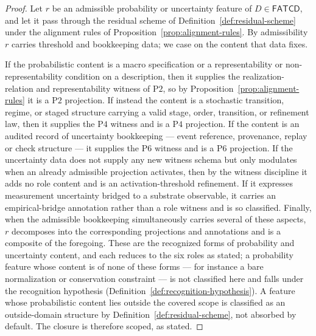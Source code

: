 \documentclass[11pt]{article}
\theoremstyle{definition}
\newcommand{\FATCD}{\ensuremath{\mathsf{FATCD}}}
\newcommand{\Ptwo}{\ensuremath{\mathrm{P2}}}
\newcommand{\Pfour}{\ensuremath{\mathrm{P4}}}
\newcommand{\Psix}{\ensuremath{\mathrm{P6}}}
\begin{document}
\begin{proof}
Let \(r\) be an admissible probability or uncertainty feature of
\(D \in \FATCD{}\), and let it pass through the residual scheme of
Definition~\ref{def:residual-scheme} under the alignment rules of
Proposition~\ref{prop:alignment-rules}. By admissibility \(r\) carries
threshold and bookkeeping data; we case on the content that data fixes.

If the probabilistic content is a macro specification or a
representability or non-representability condition on a description,
then it supplies the realization-relation and representability witness
of \Ptwo{}, so by Proposition~\ref{prop:alignment-rules} it is a
\Ptwo{} projection. If instead the content is a stochastic transition,
regime, or staged structure carrying a valid stage, order, transition,
or refinement law, then it supplies the \Pfour{} witness and is a
\Pfour{} projection. If the content is an audited record of uncertainty
bookkeeping --- event reference, provenance, replay or check structure
--- it supplies the \Psix{} witness and is a \Psix{} projection. If the
uncertainty data does not supply any new witness schema but only
modulates when an already admissible projection activates, then by the
witness discipline it adds no role content and is an
activation-threshold refinement. If it expresses measurement
uncertainty bridged to a substrate observable, it carries an
empirical-bridge annotation rather than a role witness and is so
classified. Finally, when the admissible bookkeeping simultaneously
carries several of these aspects, \(r\) decomposes into the
corresponding projections and annotations and is a composite of the
foregoing. These are the recognized forms of probability and uncertainty content, and
each reduces to the six roles as stated; a probability feature whose content is
of none of these forms --- for instance a bare normalization or conservation
constraint --- is not classified here and falls under the recognition hypothesis
(Definition~\ref{def:recognition-hypothesis}).
A feature whose probabilistic content lies outside the covered scope is
classified as an outside-domain structure by
Definition~\ref{def:residual-scheme}, not absorbed by default. The
closure is therefore scoped, as stated.
\end{proof}
\end{document}
